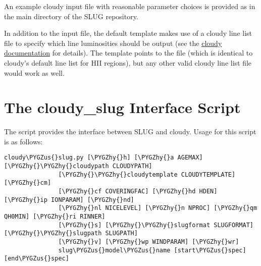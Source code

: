 \documentclass[letterpaper,10pt,english]{sphinxmanual}
\def\PYGZus{\char`\_}
\def\PYGZhy{\char`\-}
\begin{document}
An example cloudy input file with reasonable parameter choices is
provided as  in the main directory
of the SLUG repository.

In addition to the input file, the default template makes use of a
cloudy line list file to specify which line luminosities should be
output (see the \href{http://nublado.org}{cloudy documentation} for
details). The template points to the file
 (which is identical to cloudy's
default line list for HII regions), but any other valid cloudy line
list file would work as well.


\section{The cloudy\_slug Interface Script}
\label{cloudy:ssec-cloudy-slug-options}\label{cloudy:the-cloudy-slug-interface-script}
The  script provides the interface between SLUG and
cloudy. Usage for this script is as follows:

\begin{Verbatim}[commandchars=\\\{\}]
cloudy\PYGZus{}slug.py [\PYGZhy{}h] [\PYGZhy{}a AGEMAX] [\PYGZhy{}\PYGZhy{}cloudypath CLOUDYPATH]
               [\PYGZhy{}\PYGZhy{}cloudytemplate CLOUDYTEMPLATE] [\PYGZhy{}cm]
               [\PYGZhy{}cf COVERINGFAC] [\PYGZhy{}hd HDEN] [\PYGZhy{}ip IONPARAM] [\PYGZhy{}nd]
               [\PYGZhy{}nl NICELEVEL] [\PYGZhy{}n NPROC] [\PYGZhy{}qm QH0MIN] [\PYGZhy{}ri RINNER]
               [\PYGZhy{}s] [\PYGZhy{}\PYGZhy{}slugformat SLUGFORMAT] [\PYGZhy{}\PYGZhy{}slugpath SLUGPATH]
               [\PYGZhy{}v] [\PYGZhy{}wp WINDPARAM] [\PYGZhy{}wr]
               slug\PYGZus{}model\PYGZus{}name [start\PYGZus{}spec] [end\PYGZus{}spec]
\end{Verbatim}
\end{document}
